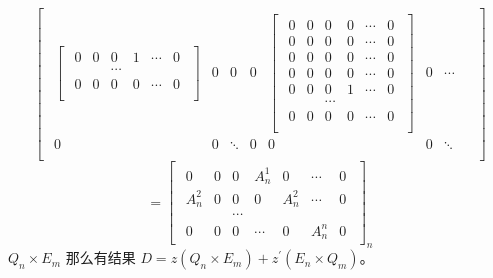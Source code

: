 \documentclass[twoside,a4paper,CCT]{cctart}   %
\begin{document}
$$\begin{bmatrix}
\begin{smallmatrix}
\begin{bmatrix}
\begin{smallmatrix}
 0& 0& 0&1&\cdots&0\\
 & & \cdots& &\\
0& 0& 0& 0&\cdots&0\\
 \end{smallmatrix}\end{bmatrix}& 0& 0& 0&
 \begin{bmatrix}\begin{smallmatrix}
  0& 0& 0&0&\cdots&0\\
 0& 0& 0&0&\cdots&0\\
 0& 0& 0&0&\cdots&0\\
 0& 0& 0&0&\cdots&0\\
 0& 0& 0&1&\cdots&0\\
 & & \cdots& &\\
0& 0& 0& 0&\cdots&0\\
 \end{smallmatrix}\end{bmatrix}& 0& \cdots&\\
 0& 0& \ddots &0 &0 &0 &\ddots \\
\end{smallmatrix}\end{bmatrix}$$
$$= \begin{bmatrix}\begin{smallmatrix}
 0& 0& 0& A^{1}_{n} & 0 &\cdots& 0\\
 A^{2}_{n} & 0& 0& 0& A^{2}_{n} &\cdots& 0\\
 & & \cdots & &\\
 0& 0& 0& \cdots& 0& A^{n}_{n}& 0
\end{smallmatrix}\end{bmatrix}_{n} $$
$Q_{n}\times E_{m}$
那么有结果
$D=z(Q_{n}\times E_{m})  +  z^{'} (E_{n} \times Q_{m})$。\\
\end{document}
